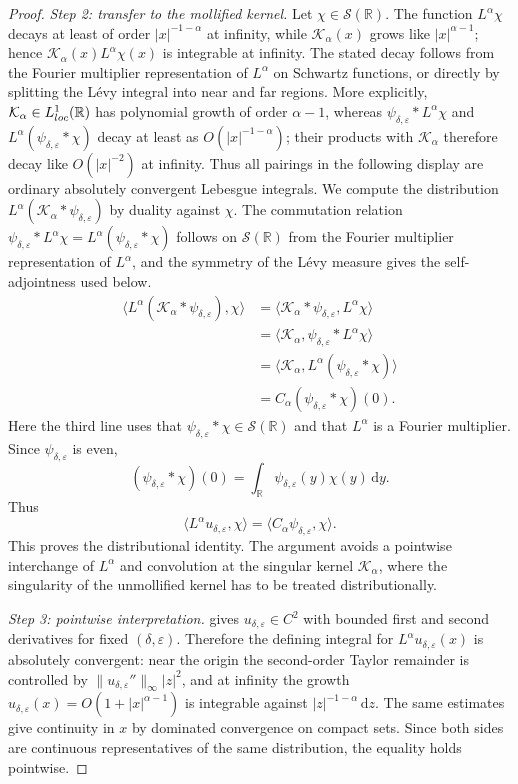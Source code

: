 \documentclass[10pt,a4paper]{amsart}
\newcommand{\R}{\mathbb{R}}
\newcommand{\1}{\mathbf{1}}
\newcommand{\dd}{\,\mathrm{d}}
\newcommand{\eps}{\varepsilon}
\newcommand{\RieszK}{\mathcal K_\alpha}
\begin{document}
\begin{proof}
\emph{Step 2: transfer to the mollified kernel.} Let $\chi\in\mathcal S(\R)$. The function $L^\alpha\chi$ decays at least of order $|x|^{-1-\alpha}$ at infinity, while $\RieszK(x)$ grows like $|x|^{\alpha-1}$; hence $\RieszK(x)L^\alpha\chi(x)$ is integrable at infinity. The stated decay follows from the Fourier multiplier representation of $L^\alpha$ on Schwartz functions, or directly by splitting the L\'evy integral into near and far regions. More explicitly, $\RieszK\in L^1_{\rm loc}(\R)$ has polynomial growth of order $\alpha-1$, whereas $\psi_{\delta,\eps}*L^\alpha\chi$ and $L^\alpha(\psi_{\delta,\eps}*\chi)$ decay at least as $O(|x|^{-1-\alpha})$; their products with $\RieszK$ therefore decay like $O(|x|^{-2})$ at infinity. Thus all pairings in the following display are ordinary absolutely convergent Lebesgue integrals. We compute the distribution $L^\alpha(\RieszK*\psi_{\delta,\eps})$ by duality against $\chi$. The commutation relation $\psi_{\delta,\eps}*L^\alpha\chi=L^\alpha(\psi_{\delta,\eps}*\chi)$ follows on $\mathcal S(\R)$ from the Fourier multiplier representation of $L^\alpha$, and the symmetry of the L\'evy measure gives the self-adjointness used below.
\begin{align*}
\langle L^\alpha(\RieszK*\psi_{\delta,\eps}),\chi\rangle
&=\langle \RieszK*\psi_{\delta,\eps},L^\alpha\chi\rangle\\
&=\langle \RieszK,\psi_{\delta,\eps}*L^\alpha\chi\rangle\\
&=\langle \RieszK,L^\alpha(\psi_{\delta,\eps}*\chi)\rangle\\
&=C_\alpha(\psi_{\delta,\eps}*\chi)(0).
\end{align*}
Here the third line uses that $\psi_{\delta,\eps}*\chi\in\mathcal S(\R)$ and that $L^\alpha$ is a Fourier multiplier. Since $\psi_{\delta,\eps}$ is even,
\[
  (\psi_{\delta,\eps}*\chi)(0)=\int_{\R}\psi_{\delta,\eps}(y)\chi(y)\dd y.
\]
Thus
\[
  \langle L^\alpha u_{\delta,\eps},\chi\rangle
  =\langle C_\alpha\psi_{\delta,\eps},\chi\rangle.
\]
This proves the distributional identity. The argument avoids a pointwise interchange of $L^\alpha$ and convolution at the singular kernel $\RieszK$, where the singularity of the unmollified kernel has to be treated distributionally.

\emph{Step 3: pointwise interpretation.}  gives $u_{\delta,\eps}\in C^2$ with bounded first and second derivatives for fixed $(\delta,\eps)$. Therefore the defining integral for $L^\alpha u_{\delta,\eps}(x)$ is absolutely convergent: near the origin the second-order Taylor remainder is controlled by $\|u_{\delta,\eps}''\|_\infty |z|^2$, and at infinity the growth $u_{\delta,\eps}(x)=O(1+|x|^{\alpha-1})$ is integrable against $|z|^{-1-\alpha}\dd z$. The same estimates give continuity in $x$ by dominated convergence on compact sets. Since both sides are continuous representatives of the same distribution, the equality holds pointwise.


\end{proof}
\end{document}
